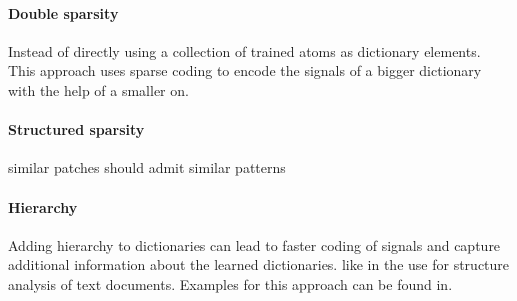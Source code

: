 \paragraph{Double sparsity}
Instead of directly using a collection of trained atoms as dictionary
elements. This approach uses sparse coding to encode the signals of a bigger
dictionary with the help of a smaller on.\cite{Rubinstein2009} 

\paragraph{Structured sparsity}
similar patches should admit similar patterns \cite{Mairal2009} 
\cite{group sparsity}

\paragraph{Hierarchy}
Adding hierarchy to dictionaries can lead to faster coding of signals and
capture additional information about the learned dictionaries. like in the use
for structure analysis of text documents. Examples for this approach can be
found in\cite{Jenatton2010}.






